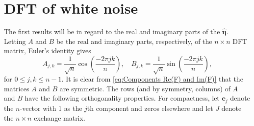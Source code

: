 \documentclass[12pt,notitlepage]{report}
\newcommand{\noise}{\eta}	%
\newcommand{\noiseVec}{\bm{\noise}}	%
\begin{document}
\section{DFT of white noise} \label{ch:DFT of white noise}
The first results will be in regard to the real and imaginary parts of the $\widehat{\noiseVec}$. Letting $A$ and $B$ be the real and imaginary parts, respectively, of the $n \times n$ DFT matrix, Euler's identity gives
\begin{equation}
A_{j,k} = \frac{1}{\sqrt{n}}\cos\left(\frac{-2\pi{jk}}{n}\right), \quad B_{j,k} = \frac{1}{\sqrt{n}}\sin\left(\frac{-2\pi{jk}}{n}\right),
\label{eq:Components Re(F) and Im(F)}
\end{equation}
for $0 \leq j,k \leq n-1$. It is clear from \eqref{eq:Components Re(F) and Im(F)} that the matrices $A$ and $B$ are symmetric. The rows (and by symmetry, columns) of $A$ and $B$ have the following orthogonality properties. For compactness, let $\mathbf{e}_j$ denote the $n$-vector with 1 as the $j$th component and zeros elsewhere and let $J$ denote the $n \times n$ exchange matrix.
\end{document}
